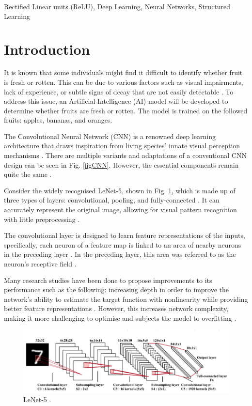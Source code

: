 \documentclass[conference]{IEEEtran}
\begin{document}
\begin{IEEEkeywords}
Rectified Linear units (ReLU), Deep Learning, Neural Networks, Structured Learning
\end{IEEEkeywords}

\section{Introduction}

It is known that some individuals might find it difficult to identify whether fruit is fresh or rotten. This can be due to various factors such as visual impairments, lack of experience, or subtle signs of decay that are not easily detectable \cite{b22}. To address this issue, an Artificial Intelligence (AI) model will be developed to determine whether fruits are fresh or rotten. The model is trained on the followed fruits: apples, bananas, and oranges.

The Convolutional Neural Network (CNN) is a renowned deep learning architecture that draws inspiration from living species' innate visual perception mechanisms \cite{b21}. There are multiple variants and adaptations of a conventional CNN design \cite{b6} can be seen in Fig. \ref{figCNN}. However, the essential components remain quite the same \cite{b6}.

Consider the widely recognised LeNet-5, shown in Fig. \ref{figLeNet}, which is made up of three types of layers: convolutional, pooling, and fully-connected \cite{b6}. It can accurately represent the original image, allowing for visual pattern recognition with little preprocessing \cite{b6}.

The convolutional layer is designed to learn feature representations of the inputs, specifically, each neuron of a feature map is linked to an area of nearby neurons in the preceding layer \cite{b23}. In the preceding layer, this area was referred to as the neuron's receptive field \cite{b6}.

Many research studies have been done to propose improvements to its performance such as the following: increasing depth in order to improve the network's ability to estimate the target function with nonlinearity while providing better feature representations \cite{b6}. However, this increases network complexity, making it more challenging to optimise and subjects the model to overfitting \cite{b6}.

\begin{figure}[h]
    \centering
    \includegraphics[width=\linewidth]{LeNet-5.png}
    \caption{LeNet-5 \cite{b6}.}
    \label{figLeNet}
\end{figure}
\end{document}
